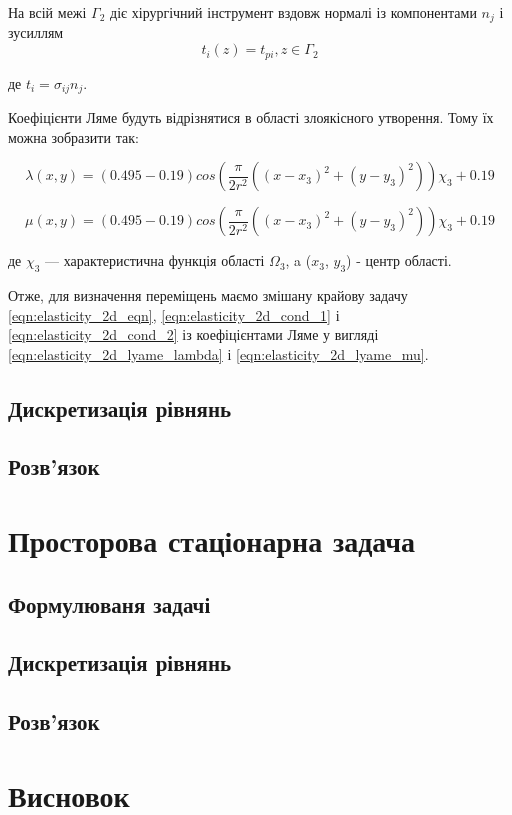 \noindent На всій межі $\Gamma_2$ діє хірургічний інструмент вздовж нормалі із компонентами $n_j$ і зусиллям
\begin{equation}
    \label{eqn:elasticity_2d_cond_2}
    t_i(z) = t_{pi}, z \in \Gamma_2
\end{equation}

\noindent де $t_i = \sigma_{ij}n_j$.

Коефіцієнти Ляме будуть відрізнятися в області злоякісного утворення. Тому їх можна зобразити так:

\begin{equation}
    \label{eqn:elasticity_2d_lyame_lambda}
    \lambda(x, y) = (0.495 - 0.19)cos(\frac{\pi}{2r^2}((x - x_3)^2 + (y - y_3)^2))\chi_3 + 0.19
\end{equation}

\begin{equation}
    \label{eqn:elasticity_2d_lyame_mu}
    \mu(x, y) = (0.495 - 0.19)cos(\frac{\pi}{2r^2}((x - x_3)^2 + (y - y_3)^2))\chi_3 + 0.19
\end{equation}

\noindent де $\chi_3$ --- характеристична функція області $\Omega_3$, a ($x_3$, $y_3$) - центр області.

Отже, для визначення переміщень маємо змішану крайову задачу \ref{eqn:elasticity_2d_eqn}, \ref{eqn:elasticity_2d_cond_1} 
і \ref{eqn:elasticity_2d_cond_2} із коефіцієнтами Ляме у вигляді \ref{eqn:elasticity_2d_lyame_lambda} і 
\ref{eqn:elasticity_2d_lyame_mu}.

\subsection{Дискретизація рівнянь}

\subsection{Розв'язок}

\section{Просторова стаціонарна задача}

\subsection{Формулюваня задачі}

\subsection{Дискретизація рівнянь}

\subsection{Розв'язок}

\section{Висновок}
